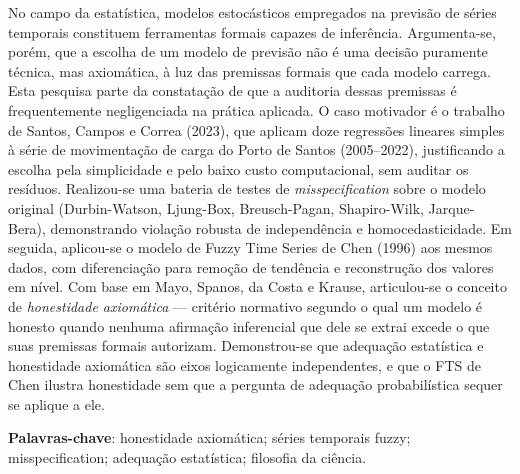 \documentclass[
    12pt,
    oneside,
    openany,
    a4paper,
    english,
    brazil
]{abntex2}
\theoremstyle{definition}
\begin{document}
\frenchspacing


\imprimircapa
\imprimirfolhaderosto*

\setlength{\absparsep}{18pt}
\begin{resumo}
No campo da estatística, modelos estocásticos empregados na previsão de séries temporais constituem ferramentas formais capazes de inferência. Argumenta-se, porém, que a escolha de um modelo de previsão não é uma decisão puramente técnica, mas axiomática, à luz das premissas formais que cada modelo carrega. Esta pesquisa parte da constatação de que a auditoria dessas premissas é frequentemente negligenciada na prática aplicada. O caso motivador é o trabalho de Santos, Campos e Correa (2023), que aplicam doze regressões lineares simples à série de movimentação de carga do Porto de Santos (2005--2022), justificando a escolha pela simplicidade e pelo baixo custo computacional, sem auditar os resíduos. Realizou-se uma bateria de testes de \textit{misspecification} sobre o modelo original (Durbin-Watson, Ljung-Box, Breusch-Pagan, Shapiro-Wilk, Jarque-Bera), demonstrando violação robusta de independência e homocedasticidade. Em seguida, aplicou-se o modelo de Fuzzy Time Series de Chen (1996) aos mesmos dados, com diferenciação para remoção de tendência e reconstrução dos valores em nível. Com base em Mayo, Spanos, da Costa e Krause, articulou-se o conceito de \textit{honestidade axiomática} --- critério normativo segundo o qual um modelo é honesto quando nenhuma afirmação inferencial que dele se extrai excede o que suas premissas formais autorizam. Demonstrou-se que adequação estatística e honestidade axiomática são eixos logicamente independentes, e que o FTS de Chen ilustra honestidade sem que a pergunta de adequação probabilística sequer se aplique a ele.

    \vspace{\onelineskip}
    \noindent
    \textbf{Palavras-chave}: honestidade axiomática; séries temporais fuzzy; misspecification; adequação estatística; filosofia da ciência.
\end{resumo}
\end{document}
